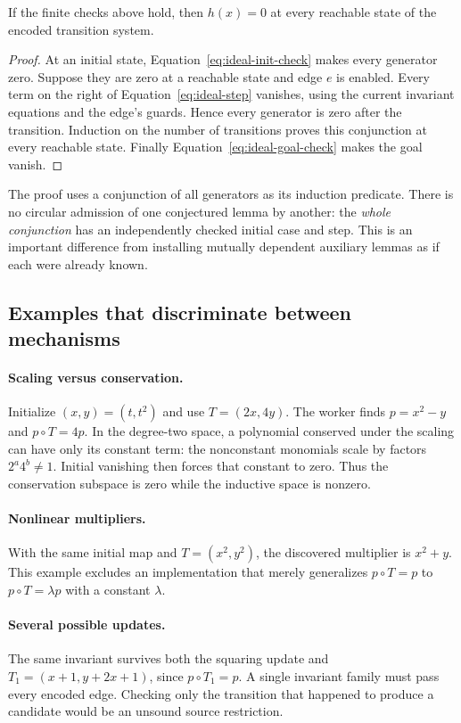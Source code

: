 \begin{theorem}
If the finite checks above hold, then $h(x)=0$ at every reachable state of the
encoded transition system.
\end{theorem}
\begin{proof}
At an initial state, Equation~\eqref{eq:ideal-init-check} makes every generator
zero. Suppose they are zero at a reachable state and edge $e$ is enabled. Every
term on the right of Equation~\eqref{eq:ideal-step} vanishes, using the current
invariant equations and the edge's guards. Hence every generator is zero after
the transition. Induction on the number of transitions proves this conjunction
at every reachable state. Finally Equation~\eqref{eq:ideal-goal-check} makes the
goal vanish.
\end{proof}

The proof uses a conjunction of all generators as its induction predicate.
There is no circular admission of one conjectured lemma by another: the
\emph{whole conjunction} has an independently checked initial case and step.
This is an important difference from installing mutually dependent auxiliary
lemmas as if each were already known.

\subsection{Examples that discriminate between mechanisms}

\paragraph{Scaling versus conservation.}
Initialize $(x,y)=(t,t^2)$ and use $T=(2x,4y)$. The worker finds $p=x^2-y$ and
$p\circ T=4p$. In the degree-two space, a polynomial conserved under the scaling
can have only its constant term: the nonconstant monomials scale by factors
$2^a4^b\ne1$. Initial vanishing then forces that constant to zero. Thus the
conservation subspace is zero while the inductive space is nonzero.

\paragraph{Nonlinear multipliers.}
With the same initial map and $T=(x^2,y^2)$, the discovered multiplier is
$x^2+y$. This example excludes an implementation that merely generalizes
$p\circ T=p$ to $p\circ T=\lambda p$ with a constant $\lambda$.

\paragraph{Several possible updates.}
The same invariant survives both the squaring update and
$T_1=(x+1,y+2x+1)$, since $p\circ T_1=p$. A single invariant family must pass
every encoded edge. Checking only the transition that happened to produce a
candidate would be an unsound source restriction.

